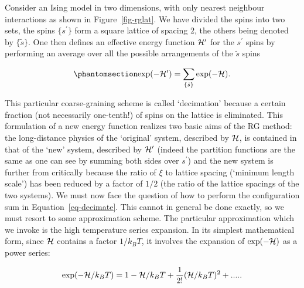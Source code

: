 \documentclass[
  letterpaper,
  enabledeprecatedfontcommands]{report}
\begin{document}
\begin{tcolorbox}
\begin{figure}[H]
\end{figure}%

Consider an Ising model in two dimensions, with only nearest neighbour
interactions as shown in Figure~\ref{fig-rglat}. We have divided the
spins into two sets, the spins \(\{s^\prime\}\) form a square lattice of
spacing \(2\), the others being denoted by \(\{\tilde{s}\}\). One then
defines an effective energy function \({\cal H^\prime}\) for the
\(s^\prime\) spins by performing an average over all the possible
arrangements of the \(\tilde{s}\) spins

\begin{equation}\phantomsection\label{eq-decimate}{
\exp(-{\cal H}^\prime)=\sum_{\{\tilde {s}\}} \exp(-{\cal H}).
}\end{equation}

This particular coarse-graining scheme is called `decimation' because a
certain fraction (not necessarily one-tenth!) of spins on the lattice is
eliminated. This formulation of a new energy function realizes two basic
aims of the RG method: the long-distance physics of the `original'
system, described by \({\cal H}\), is contained in that of the `new'
system, described by \({\cal H}^\prime\) (indeed the partition functions
are the same as one can see by summing both sides over \(s^\prime\)) and
the new system is further from critically because the ratio of \(\xi\)
to lattice spacing (`minimum length scale') has been reduced by a factor
of \(1/2\) (the ratio of the lattice spacings of the two systems). We
must now face the question of how to perform the configuration sum in
Equation~\ref{eq-decimate}. This cannot in general be done exactly, so
we must resort to some approximation scheme. The particular
approximation which we invoke is the high temperature series expansion.
In its simplest mathematical form, since \({\cal H}\) contains a factor
\(1/k_BT\), it involves the expansion of \(\exp(-{\cal H})\) as a power
series:

\[\exp(-{\cal H}/k_BT)=1-{\cal H}/k_BT +\frac{1}{2!}({\cal H}/k_BT)^2+.....\]


\end{tcolorbox}
\end{document}
